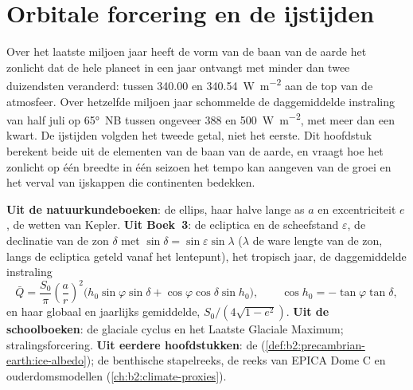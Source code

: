 \chapter{Orbitale forcering en de ijstijden}\label{ch:b2:orbital-forcing}

Over het laatste miljoen jaar heeft de vorm van de baan van de aarde het zonlicht dat de hele
planeet in een jaar ontvangt met minder dan twee duizendsten veranderd: tussen \num{340.00} en
\qty{340.54}{W.m^{-2}} aan de top van de atmosfeer. Over hetzelfde miljoen jaar schommelde de daggemiddelde
instraling van half juli op \ang{65}~NB tussen ongeveer 388 en \qty{500}{W.m^{-2}}, met meer dan
een kwart. De ijstijden volgden het tweede getal, niet het eerste. Dit hoofdstuk berekent beide
uit de elementen van de baan van de aarde, en vraagt hoe het zonlicht op één breedte in één seizoen
het tempo kan aangeven van de groei en het verval van ijskappen die continenten bedekken.

\begin{recall}
\textbf{Uit de natuurkundeboeken}: de ellips, haar halve lange as $a$ en excentriciteit $e$, de wetten
van Kepler. \textbf{Uit Boek~3}: de ecliptica en de scheefstand $\varepsilon$, de
declinatie van de zon $\delta$ met $\sin\delta = \sin\varepsilon\sin\lambda$ ($\lambda$ de ware
lengte van de zon, langs de ecliptica geteld vanaf het lentepunt), het tropisch jaar, de daggemiddelde
instraling
\[
  \bar Q = \frac{S_0}{\pi}\left(\frac{a}{r}\right)^{2}\bigl(h_0\sin\varphi\sin\delta +
  \cos\varphi\cos\delta\sin h_0\bigr),\qquad \cos h_0 = -\tan\varphi\tan\delta ,
\]
en haar globaal en jaarlijks gemiddelde, $S_0/(4\sqrt{1 - e^2})$. \textbf{Uit de schoolboeken}: de
glaciale cyclus en het Laatste Glaciale Maximum; stralingsforcering. \textbf{Uit eerdere hoofdstukken}: de
 (\cref{def:b2:precambrian-earth:ice-albedo}); de benthische stapelreeks, de reeks van EPICA
Dome C en ouderdomsmodellen (\cref{ch:b2:climate-proxies}).
\end{recall}

